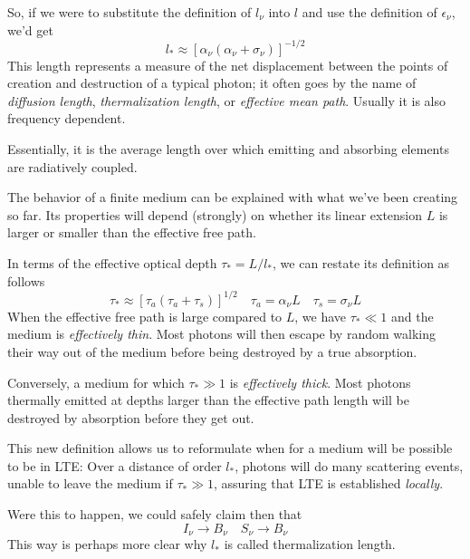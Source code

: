 \par So, if we were to substitute the definition of $l_{\nu}$ into $l$ and use the definition of $\epsilon_{\nu}$, we'd get 
\begin{equation*}
    l_{*} \approx \left[\alpha_{\nu}(\alpha_{\nu}+\sigma_{\nu})\right]^{-1/2}
\end{equation*}
This length represents a measure of the net displacement between the points of creation and destruction of a typical photon; it often goes by the name of \emph{diffusion length}, \emph{thermalization length}, or \emph{effective mean path}. Usually it is also frequency dependent.
\par Essentially, it is the average length over which emitting and absorbing elements are radiatively coupled.
\par The behavior of a finite medium can be explained with what we've been creating so far. Its properties will depend (strongly) on whether its linear extension $L$ is larger or smaller than the effective free path.
\par In terms of the effective optical depth $\tau_{*} = L/l_{*}$, we can restate its definition as follows
\begin{equation*}
    \tau_{*} \approx \left[\tau_{a}(\tau_{a}+\tau_{s})\right]^{1/2} \quad \tau_{a} = \alpha_{\nu}L \quad \tau_{s}=\sigma_{\nu}L
\end{equation*}
When the effective free path is large compared to $L$, we have $\tau_{*} \ll 1$ and the medium is \emph{effectively thin}. Most photons will then escape by random walking their way out of the medium before being destroyed by a true absorption. 
\par Conversely, a medium for which $\tau_{*} \gg 1$ is \emph{effectively thick}. Most photons thermally emitted at depths larger than the effective path length will be destroyed by absorption before they get out.
\par This new definition allows us to reformulate when for a medium will be possible to be in LTE: Over a distance of order $l_{*}$, photons will do many scattering events, unable to leave the medium if $\tau_{*}\gg 1$, assuring that LTE is established \emph{locally}.
\par Were this to happen, we could safely claim then that 
\begin{equation*}
    I_{\nu} \to B_{\nu} \quad S_{\nu} \to B_{\nu}
\end{equation*}
This way is perhaps more clear why $l_{*}$ is called thermalization length.